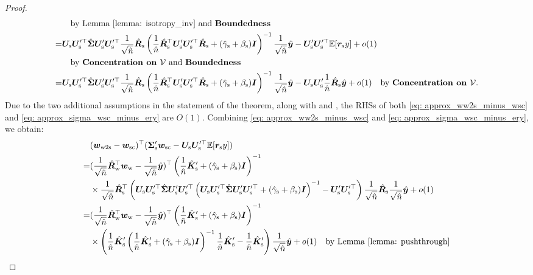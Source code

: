 \begin{proof}
\begin{align}
    \nonumber
    &\quad\text{by Lemma \ref{lemma: isotropy_inv} and \textbf{Boundedness}{}} \\
    \nonumber
    = & {\bm{U}}_{\text{s}}{\bm{U}}_{\text{s}}'^\top\hat{{\bm{\Sigma}}}{\bm{U}}_{\text{s}}'{\bm{U}}_{\text{s}}'^\top \frac{1}{\sqrt{\hat{n}}}\hat{{\bm{R}}}_{\text{s}}  \left(\frac{1}{\hat{n}}\hat{{\bm{R}}}_{\text{s}}^\top{\bm{U}}_{\text{s}}'{\bm{U}}_{\text{s}}'^\top\hat{{\bm{R}}}_{\text{s}} + (\hat{\gamma}_{\text{s}}+\beta_{\text{s}}){\bm{I}}  \right)^{-1} \frac{1}{\sqrt{\hat{n}}} \hat{{\bm{y}}} -{\bm{U}}_{\text{s}}'{\bm{U}}_{\text{s}}'^\top\mathbb{E} [{\bm{r}}_{\text{s}} y]+ o(1) \\
    \nonumber
    &\quad\text{by \textbf{Concentration on ${\mathcal{V}}$}{} and \textbf{Boundedness}{}}\\
    \label{eq: approx_sigma_wsc_minus_ery}
    = & {\bm{U}}_{\text{s}}{\bm{U}}_{\text{s}}'^\top\hat{{\bm{\Sigma}}}{\bm{U}}_{\text{s}}'{\bm{U}}_{\text{s}}'^\top \frac{1}{\sqrt{\hat{n}}}\hat{{\bm{R}}}_{\text{s}}  \left(\frac{1}{\hat{n}}\hat{{\bm{R}}}_{\text{s}}^\top{\bm{U}}_{\text{s}}'{\bm{U}}_{\text{s}}'^\top\hat{{\bm{R}}}_{\text{s}} + (\hat{\gamma}_{\text{s}}+\beta_{\text{s}}){\bm{I}}  \right)^{-1} \frac{1}{\sqrt{\hat{n}}} \hat{{\bm{y}}}  -{\bm{U}}_{\text{s}}{\bm{U}}_{\text{s}}'\frac{1}{\hat{n}}\hat{{\bm{R}}}_{\text{s}}\hat{{\bm{y}}} + o(1) \quad\text{by \textbf{Concentration on ${\mathcal{V}}$}{}}.
\end{align}
Due to the two additional assumptions in the statement of the theorem, along with \conc{} and \bounded{}, the RHSs of both \eqref{eq: approx_ww2s_minus_wsc} and \eqref{eq: approx_sigma_wsc_minus_ery} are $O(1)$.
Combining \eqref{eq: approx_ww2s_minus_wsc} and \eqref{eq: approx_sigma_wsc_minus_ery},  we obtain:
\begin{align}
    \nonumber
    & (\vw_\wtos- \vw_\sceiling)^\top  ( \mSigma_\s' \vw_\sceiling - \mU_\s\mU_\s'^\top\E[\vr_\s y] ) \\
    \nonumber
    = & (\frac{1}{\sqrt{\hat{n}}}  \hat{\mR}_\w^\top \vw_\w - \frac{1}{\sqrt{\hat{n}}} \hat{\vy} )^\top \left( \frac{1}{\hat{n}}\hat{\mK}_\s' + (\hat{\gamma}_\s+\beta_\s)\mI  \right )^{-1}\\
    \nonumber
   & \times\frac{1}{\sqrt{\hat{n}}}\hat{\mR}_\s^\top \left(\mU_\s\mU_\s'^\top\hat{\mSigma}\mU_\s'\mU_\s'^\top \left(\mU_\s\mU_\s'^\top\hat{\mSigma}\mU_\s'\mU_\s'^\top + (\hat{\gamma}_\s+\beta_\s)\mI  \right)^{-1} -\mU_\s'\mU_\s'^\top\right) \frac{1}{\sqrt{\hat{n}}}\hat{\mR}_\s   \frac{1}{\sqrt{\hat{n}}} \hat{\vy} + o(1) \\
       \nonumber
    = & (\frac{1}{\sqrt{\hat{n}}}  \hat{\mR}_\w^\top \vw_\w - \frac{1}{\sqrt{\hat{n}}} \hat{\vy} )^\top \left( \frac{1}{\hat{n}}\hat{\mK}_\s' + (\hat{\gamma}_\s+\beta_\s)\mI  \right )^{-1} \\
    \nonumber
    & \times\left(\frac{1}{\hat{n}}\hat{\mK}_\s' \left(\frac{1}{\hat{n}}\hat{\mK}_\s' +(\hat{\gamma}_\s+\beta_\s)\mI \right)^{-1} \frac{1}{\hat{n}}\hat{\mK}_\s' - \frac{1}{\hat{n}}\hat{\mK}_\s'\right) \frac{1}{\sqrt{\hat{n}}} \hat{\vy}  + o(1)\quad\text{by Lemma \ref{lemma: pushthrough}}\\

\end{align}
\end{proof}
